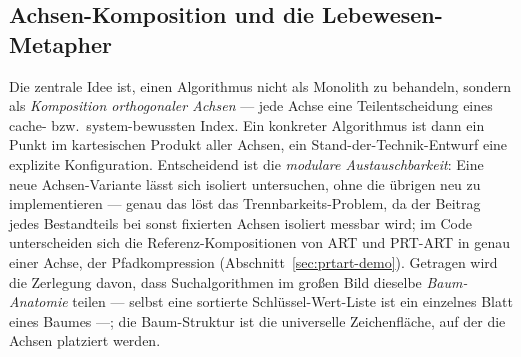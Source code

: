 \begin{nurkurz}
\subsection{Achsen-Komposition und die Lebewesen-Metapher}\label{sec:anatomy-metaphor}
Die zentrale Idee ist, einen Algorithmus nicht als Monolith zu behandeln, sondern als \emph{Komposition
orthogonaler Achsen} --- jede Achse eine Teilentscheidung eines cache- bzw.\ system-bewussten Index. Ein
konkreter Algorithmus ist dann ein Punkt im kartesischen Produkt aller Achsen, ein Stand-der-Technik-Entwurf
eine explizite Konfiguration. Entscheidend ist die \emph{modulare Austauschbarkeit}: Eine neue Achsen-Variante
lässt sich isoliert untersuchen, ohne die übrigen neu zu implementieren --- genau das löst das
Trennbarkeits-Problem, da der Beitrag jedes Bestandteils bei sonst fixierten Achsen isoliert messbar wird; im
Code unterscheiden sich die Referenz-Kompositionen von ART und PRT-ART in genau einer Achse, der
Pfadkompression (Abschnitt~\ref{sec:prtart-demo}). Getragen wird die Zerlegung davon, dass Suchalgorithmen im
großen Bild dieselbe \emph{Baum-Anatomie} teilen --- selbst eine sortierte Schlüssel-Wert-Liste ist ein
einzelnes Blatt eines Baumes ---; die Baum-Struktur ist die universelle Zeichenfläche, auf der die Achsen
platziert werden.
\end{nurkurz}

